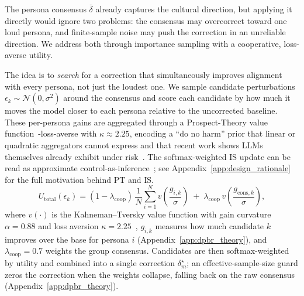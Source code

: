 \documentclass{article}
\begin{document}
The persona consensus $\bar{\delta}$ already captures the cultural direction, but
applying it directly would ignore two problems: the consensus may overcorrect
toward one loud persona, and finite-sample noise may push the correction in an
unreliable direction. We address both through importance sampling with a
cooperative, loss-averse utility.

The idea is to \emph{search} for a correction that simultaneously improves
alignment with every persona, not just the loudest one. We sample candidate
perturbations $\epsilon_k \sim \mathcal{N}(0,\sigma^2)$ around the consensus
and score each candidate by how much it moves the model closer to each
persona relative to the uncorrected baseline. These per-persona gains are
aggregated through a Prospect-Theory value
function~\citep{kahneman1979prospect, tversky1992advances}-loss-averse with
$\kappa{\approx}2.25$, encoding a ``do no harm'' prior that linear or
quadratic aggregators cannot express and that recent work shows LLMs
themselves already exhibit under risk~\citep{payne2025prospect}. The
softmax-weighted IS update can be read as approximate
control-as-inference~\citep{williams2017mppi, levine2018reinforcement}; see
Appendix~\ref{app:design_rationale} for the full motivation behind PT and IS\@.
\begin{equation}
  U_{\text{total}}(\epsilon_k)
  = (1 - \lambda_{\text{coop}})\,\frac{1}{N}\sum_{i=1}^{N}
      v\!\left(\frac{g_{i,k}}{\sigma}\right)
  \;+\; \lambda_{\text{coop}}\,
      v\!\left(\frac{g_{\text{cons},k}}{\sigma}\right),
  \label{eq:util_total}
\end{equation}
where $v(\cdot)$ is the Kahneman--Tversky value function with gain curvature
$\alpha{=}0.88$ and loss aversion $\kappa{=}2.25$~\citep{kahneman1979prospect},
$g_{i,k}$ measures how much candidate $k$ improves over the base for persona $i$
(Appendix~\ref{app:dpbr_theory}), and $\lambda_{\text{coop}}{=}0.7$ weights
the group consensus. Candidates are then softmax-weighted by utility and
combined into a single correction $\delta^{\star}_m$; an effective-sample-size
guard zeros the correction when the weights collapse, falling back on the
raw consensus (Appendix~\ref{app:dpbr_theory}).
\end{document}
